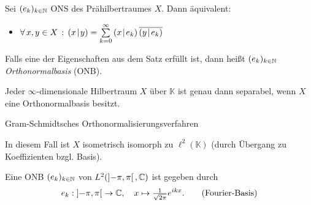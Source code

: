 \documentclass{cheat-sheet}
\newcommand{\K}{\mathbb{K}}
\newcommand{\scp}[2]{\left( #1 \!\mid\! #2 \right)} %
\begin{document}
\begin{satz}
  Sei $(e_k)_{k \in \mathbb{N}}$ ONS des Prähilbertraumes $X$. Dann äquivalent:
  \begin{itemize}
    \vspace{4pt}
    \item $\fa{x, y \in X} \scp{x}{y} = \sum_{k=0}^\infty \scp{x}{e_k} \overline{\scp{y}{e_k}}$ 
  \end{itemize}
\end{satz}

\begin{defn}
  Falls eine der Eigenschaften aus dem Satz erfüllt ist, dann heißt $(e_k)_{k \in \mathbb{N}}$ \emph{Orthonormalbasis} (ONB).
\end{defn}

\begin{satz}
  Jeder $\infty$-dimensionale Hilbertraum $X$ über $\K$ ist genau dann separabel, wenn $X$ eine Orthonormalbasis besitzt.
\end{satz}

\begin{beweisidee}
  Gram-Schmidtsches Orthonormalisierungsverfahren
\end{beweisidee}

\begin{bem}
  In diesem Fall ist $X$ isometrisch isomorph zu $\ell^2(\K)$ (durch Übergang zu Koeffizienten bzgl. Basis).
\end{bem}



\begin{bsp}
  Eine ONB $(e_k)_{k \in \mathbb{N}}$ von $L^2(\left] -\pi, \pi \right[, \mathbb{C})$ ist gegeben durch
  \[
    e_k : \left] -\pi, \pi \right[ \to \mathbb{C}, \quad x \mapsto \tfrac{1}{\sqrt{2\pi}} e^{ikx}. \tag*{(Fourier-Basis)}
  \]

\end{bsp}
\end{document}
